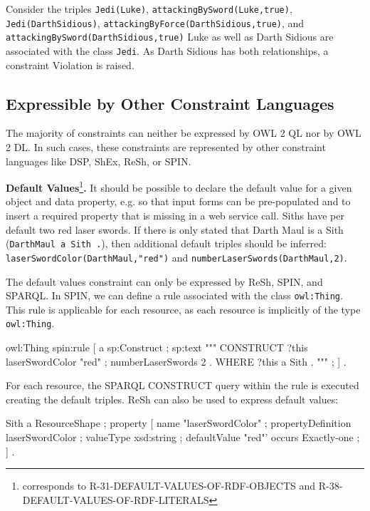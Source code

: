 \documentclass{llncs}
\newcommand{\ms}[1]{\texttt{#1}}
\begin{document}
Consider the triples \ms{Jedi(Luke)}, \ms{attackingBySword(Luke,true)}, \ms{Jedi(DarthSidious)},
\ms{attackingByForce(DarthSidious,true)}, and \ms{attackingBySword(DarthSidious,true)}
Luke as well as Darth Sidious are associated with the class \ms{Jedi}.
As Darth Sidious has both relationships, a constraint Violation is raised.

\subsection{Expressible by Other Constraint Languages}

The majority of constraints can neither be expressed by OWL 2 QL nor by OWL 2 DL. 
In such cases, these constraints are represented by other constraint languages like DSP, ShEx, ReSh, or SPIN.

\textbf{Default Values}\footnote{corresponds to R-31-DEFAULT-VALUES-OF-RDF-OBJECTS and R-38-DEFAULT-VALUES-OF-RDF-LITERALS}\textbf{.}
It should be possible to declare the default value for a given object and data property, e.g. so that input forms can be pre-populated and to insert a required property that is missing in a web service call. 
Siths have per default two red laser swords.
If there is only stated that Darth Maul is a Sith (\ms{DarthMaul a Sith .}), then additional default triples should be inferred: 
\ms{laserSwordColor(DarthMaul,"red")} and \ms{numberLaserSwords(DarthMaul,2)}.

The default values constraint can only be expressed by ReSh, SPIN, and SPARQL.
In SPIN, we can define a rule associated with the class \ms{owl:Thing}.
This rule is applicable for each resource, as each resource is implicitly of the type \ms{owl:Thing}. 

\begin{ex}
owl:Thing spin:rule [ a sp:Construct ; sp:text """
    CONSTRUCT {
        ?this laserSwordColor "red" ;
              numberLaserSwords 2 . }
    WHERE {             
        ?this a Sith . } """ ; ] .
\end{ex}

For each resource, the SPARQL CONSTRUCT query within the rule is executed creating the default triples.
ReSh can also be used to express default values:

\begin{ex}
Sith a ResourceShape ;
    property [
        name "laserSwordColor" ;
        propertyDefinition laserSwordColor ;
        valueType xsd:string ;
        defaultValue "red"'
        occurs Exactly-one ; ] .
\end{ex}
\end{document}
